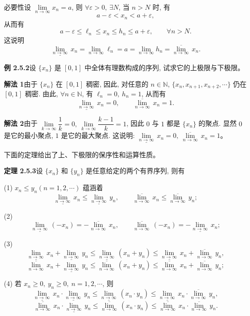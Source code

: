 \documentclass[UTF8, 12pt, fontset=fandol, oneside]{ctexart}
\begin{document}
必要性\quad 设 $\lim\limits_{n\to\infty}x_n=a$, 则 $\forall\varepsilon>0,\ \exists N$, 当 $n>N$ 时, 有
\[
  a-\varepsilon<x_n<a+\varepsilon,
\]
从而有
\[
  a-\varepsilon\leqslant\ell_n\leqslant x_n\leqslant h_n\leqslant a+\varepsilon,\qquad \forall n>N.
\]
这说明
\[
  \underline{\lim_{n\to\infty}}\,x_n
  =
  \lim_{n\to\infty}\ell_n
  =
  a
  =
  \lim_{n\to\infty}h_n
  =
  \overline{\lim_{n\to\infty}}\,x_n.
\]

\noindent\textbf{例 2.5.2}\quad 设 $\{x_n\}$ 是 $[0,1]$ 中全体有理数构成的序列, 试求它的上极限与下极限。

\noindent\textbf{解法 1}\quad 由于 $\{x_n\}$ 在 $[0,1]$ 稠密, 因此, 对任意的 $n\in\mathbb{N}$, $\{x_n,x_{n+1},x_{n+2},\cdots\}$ 仍在 $[0,1]$ 稠密. 由此, $\forall n\in\mathbb{N}$, 有 $\ell_n=0,\ h_n=1$, 从而有
\[
  \underline{\lim_{n\to\infty}}\,x_n=0,
  \qquad
  \overline{\lim_{n\to\infty}}\,x_n=1.
\]

\noindent\textbf{解法 2}\quad 由于 $\lim\limits_{k\to\infty}\dfrac1k=0,\ \lim\limits_{k\to\infty}\dfrac{k-1}{k}=1$, 因此 $0$ 与 $1$ 都是 $\{x_n\}$ 的聚点. 显然 $0$ 是它的最小聚点, $1$ 是它的最大聚点. 这说明: $\underline{\lim\limits_{n\to\infty}}\,x_n=0,\ \overline{\lim\limits_{n\to\infty}}\,x_n=1$。

下面的定理给出了上、下极限的保序性和运算性质。

\noindent\textbf{定理 2.5.3}\quad 设 $\{x_n\}$ 和 $\{y_n\}$ 是任意给定的两个有界序列, 则有

(1) $x_n\leqslant y_n(n=1,2,\cdots)$ 蕴涵着
\[
  \underline{\lim_{n\to\infty}}\,x_n
  \leqslant
  \underline{\lim_{n\to\infty}}\,y_n,
  \qquad
  \overline{\lim_{n\to\infty}}\,x_n
  \leqslant
  \overline{\lim_{n\to\infty}}\,y_n;
\]

(2)
\[
  \underline{\lim_{n\to\infty}}\,(-x_n)
  =
  -\overline{\lim_{n\to\infty}}\,x_n,
  \qquad
  \overline{\lim_{n\to\infty}}\,(-x_n)
  =
  -\underline{\lim_{n\to\infty}}\,x_n;
\]

(3)
\[
  \underline{\lim_{n\to\infty}}\,x_n
  +
  \underline{\lim_{n\to\infty}}\,y_n
  \leqslant
  \underline{\lim_{n\to\infty}}\,(x_n+y_n)
  \leqslant
  \underline{\lim_{n\to\infty}}\,x_n
  +
  \overline{\lim_{n\to\infty}}\,y_n,
\]
\[
  \overline{\lim_{n\to\infty}}\,x_n
  +
  \underline{\lim_{n\to\infty}}\,y_n
  \leqslant
  \overline{\lim_{n\to\infty}}\,(x_n+y_n)
  \leqslant
  \overline{\lim_{n\to\infty}}\,x_n
  +
  \overline{\lim_{n\to\infty}}\,y_n;
\]

(4) 若 $x_n\geqslant0,\ y_n\geqslant0,\ n=1,2,\cdots$, 则
\[
  \underline{\lim_{n\to\infty}}\,x_n\cdot
  \underline{\lim_{n\to\infty}}\,y_n
  \leqslant
  \underline{\lim_{n\to\infty}}\,(x_n\cdot y_n)
  \leqslant
  \underline{\lim_{n\to\infty}}\,x_n\cdot
  \overline{\lim_{n\to\infty}}\,y_n,
\]
\[
  \overline{\lim_{n\to\infty}}\,x_n\cdot
  \underline{\lim_{n\to\infty}}\,y_n
  \leqslant
  \overline{\lim_{n\to\infty}}\,(x_n\cdot y_n)
  \leqslant
  \overline{\lim_{n\to\infty}}\,x_n\cdot
  \overline{\lim_{n\to\infty}}\,y_n.
\]
\end{document}
